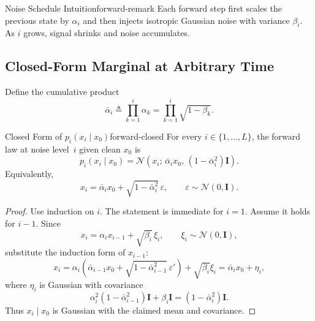 \documentclass[11pt,a4paper]{article}
\newcommand{\cN}{\mathcal{N}}
\newcommand{\balpha}{\bar{\alpha}}
\begin{document}
\begin{remark}{Noise Schedule Intuition}{forward-remark}
Each forward step first scales the previous state by $\alpha_i$ and then injects isotropic Gaussian noise with variance $\beta_i$. As $i$ grows, signal shrinks and noise accumulates.
\end{remark}

\subsection{Closed-Form Marginal at Arbitrary Time}

Define the cumulative product
\[
\balpha_i \triangleq \prod_{k=1}^{i}\alpha_k
= \prod_{k=1}^{i}\sqrt{1-\beta_k}.
\]

\begin{proposition}{Closed Form of \texorpdfstring{$p_i(x_i\mid x_0)$}{pi(xi|x0)}}{forward-closed}
For every $i\in\{1,\dots,L\}$, the forward law at noise level~$i$ given clean $x_0$ is
\[
p_i(x_i\mid x_0)
=\cN\!\left(x_i;\,\balpha_i x_0,\,(1-\balpha_i^2)\mathbf{I}\right).
\]
Equivalently,
\[
x_i = \balpha_i x_0 + \sqrt{1-\balpha_i^2}\,\varepsilon,\qquad
\varepsilon\sim\cN(0,\mathbf{I}).
\]
\end{proposition}

\begin{proof}
Use induction on $i$. The statement is immediate for $i=1$. Assume it holds for $i-1$. Since
\[
x_i=\alpha_i x_{i-1}+\sqrt{\beta_i}\,\xi_i,\qquad \xi_i\sim\cN(0,\mathbf{I}),
\]
substitute the induction form of $x_{i-1}$:
\[
x_i=\alpha_i\!\left(\balpha_{i-1}x_0+\sqrt{1-\balpha_{i-1}^2}\,\varepsilon'\right)+\sqrt{\beta_i}\xi_i
=\balpha_i x_0+\eta_i,
\]
where $\eta_i$ is Gaussian with covariance
\[
\alpha_i^2(1-\balpha_{i-1}^2)\mathbf{I}+\beta_i\mathbf{I}
=(1-\balpha_i^2)\mathbf{I}.
\]
Thus $x_i\mid x_0$ is Gaussian with the claimed mean and covariance.
\end{proof}
\end{document}
